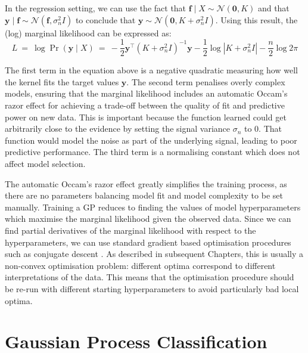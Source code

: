\documentclass[a4paper,12pt ]{report}
\renewcommand{\GP}{{GP}}
\begin{document}
In the regression setting, we can use the fact that $\bm{f} \mid X \sim \mathcal{N}(\bm{0}, K)$ and that $ \bm{y} \mid \bm{f} \sim \mathcal{N}(\bm{f},\sigma_n^2 I ) $ to conclude that $ \bm{y} \sim \mathcal{N}(\bm{0}, K + \sigma_n^2 I) $. Using this result, the (log) marginal likelihood can be expressed as:
\begin{equation*} L ~=~ \log \Pr ( \bm{y} \mid X)  ~=~  - \frac{1}{2} \bm{y}^{\top} (K + \sigma_n^2 I)^{-1} \bm{y} - \frac{1}{2} \log \left| K + \sigma_n^2 I \right| - \frac{n}{2} \log 2\pi \end{equation*}

The first term in the equation above is a negative quadratic measuring how well the kernel fits the target values $\bm{y}$. The second term penalises overly complex models, ensuring that the marginal likelihood includes an automatic Occam's razor effect for achieving a trade-off between the quality of fit and predictive power on new data. This is important because the function learned could get arbitrarily close to the evidence by setting the signal variance $\sigma_n$ to $0$. That function would model the noise as part of the underlying signal, leading to poor predictive performance. The third term is a normalising constant which does not affect model selection.

The automatic Occam's razor effect greatly simplifies the training process, as there are no parameters balancing model fit and model complexity to be set manually. Training a {\GP} reduces to finding the values of model hyperparameters which maximise the marginal likelihood given the observed data. Since we can find partial derivatives of the marginal likelihood with respect to the hyperparameters, we can use standard gradient based optimisation procedures such as conjugate descent \cite{rasmussenGPs}. As described in subsequent Chapters, this is usually a non-convex optimisation problem: different optima correspond to different interpretations of the data.  This means that the optimisation procedure should be re-run with different starting hyperparameters to avoid particularly bad local optima.




\section{Gaussian Process Classification}
\end{document}
